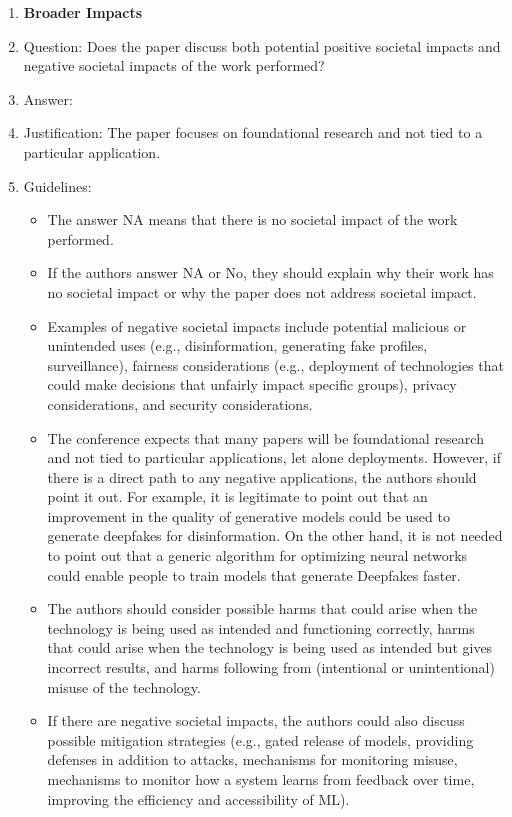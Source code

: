 \documentclass{article}
\begin{document}
{\begin{enumerate}
\item {\bf Broader Impacts}
    \item[] Question: Does the paper discuss both potential positive societal impacts and negative societal impacts of the work performed?
    \item[] Answer: \answerNo{} %
    \item[] Justification: The paper focuses on foundational research and not
      tied to a particular application.
    \item[] Guidelines:
    \begin{itemize}
        \item The answer NA means that there is no societal impact of the work performed.
        \item If the authors answer NA or No, they should explain why their work has no societal impact or why the paper does not address societal impact.
        \item Examples of negative societal impacts include potential malicious or unintended uses (e.g., disinformation, generating fake profiles, surveillance), fairness considerations (e.g., deployment of technologies that could make decisions that unfairly impact specific groups), privacy considerations, and security considerations.
        \item The conference expects that many papers will be foundational research and not tied to particular applications, let alone deployments. However, if there is a direct path to any negative applications, the authors should point it out. For example, it is legitimate to point out that an improvement in the quality of generative models could be used to generate deepfakes for disinformation. On the other hand, it is not needed to point out that a generic algorithm for optimizing neural networks could enable people to train models that generate Deepfakes faster.
        \item The authors should consider possible harms that could arise when the technology is being used as intended and functioning correctly, harms that could arise when the technology is being used as intended but gives incorrect results, and harms following from (intentional or unintentional) misuse of the technology.
        \item If there are negative societal impacts, the authors could also discuss possible mitigation strategies (e.g., gated release of models, providing defenses in addition to attacks, mechanisms for monitoring misuse, mechanisms to monitor how a system learns from feedback over time, improving the efficiency and accessibility of ML).
    \end{itemize}


\end{enumerate}}
\end{document}
